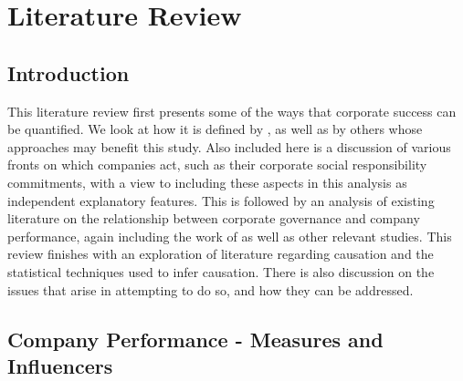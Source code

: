 %
%
%
\chapter{Literature Review}\label{C.LitReview}
\section{Introduction}\label{S.intro3}
{This literature review first presents some of the ways that corporate success can be quantified. We look at how it is defined by \cite{moldovan2015learning}, as well as by others whose approaches may benefit this study. Also included here is a discussion of various fronts on which companies act, such as their corporate social responsibility commitments, with a view to including these aspects in this analysis as independent explanatory features. This is followed by an analysis of existing literature on the relationship between corporate governance and company performance, again including the work of \cite{moldovan2015learning} as well as other relevant studies. This review finishes with an exploration of literature regarding causation and the statistical techniques used to infer causation. There is also discussion on the issues that arise in attempting to do so, and how they can be addressed. }
\section{Company Performance - Measures and Influencers}\label{comPerform}
